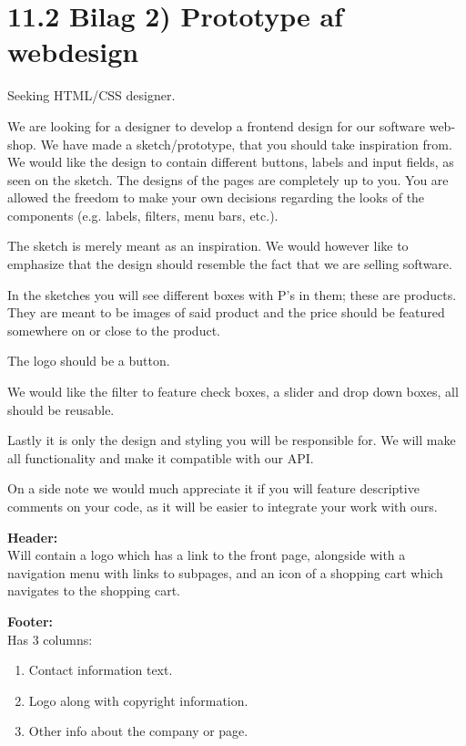 \documentclass[11pt]{report}
\begin{document}
\section*{11.2 Bilag 2) Prototype af webdesign}

\noindent Seeking HTML/CSS designer.

\noindent We are looking for a designer to develop a frontend design for our software web-shop. We have made a sketch/prototype, that you should take inspiration from. We would like the design to contain different buttons, labels and input fields, as seen on the sketch. The designs of the pages are completely up to you. You are allowed the freedom to make your own decisions regarding the looks of the components (e.g. labels, filters, menu bars, etc.).

\noindent The sketch is merely meant as an inspiration. We would however like to emphasize that the design should resemble the fact that we are selling software.

\noindent In the sketches you will see different boxes with P’s in them; these are products. They are meant to be images of said product and the price should be featured somewhere on or close to the product.

\noindent The logo should be a button.

\noindent We would like the filter to feature check boxes, a slider and drop down boxes, all should be reusable.

\noindent Lastly it is only the design and styling you will be responsible for. We will make all functionality and make it compatible with our API.

\noindent On a side note we would much appreciate it if you will feature descriptive comments on your code, as it will be easier to integrate your work with ours.

\noindent \textbf{Header:}\\
\noindent Will contain a logo which has a link to the front page, alongside with a navigation menu with links to subpages, and an icon of a shopping cart which navigates to the shopping cart. 

\noindent \textbf{Footer:}\\
\noindent Has 3 columns:
\begin{enumerate}[topsep=0pt, partopsep=0pt]
  \item Contact information text.
  \item Logo along with copyright information.
  \item Other info about the company or page.
\end{enumerate}
\end{document}
